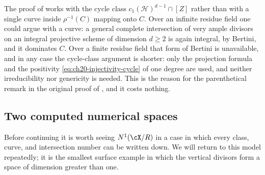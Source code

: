 \begin{remark}
\label{rem:ch20-cycle-not-curve}
The proof of  works with the cycle class
$c_1(\mathcal H)^{d-1}\cap[Z]$ rather than with a single curve inside
$\rho^{-1}(C)$ mapping onto $C$.  Over an infinite residue field one
could argue with a curve: a general complete intersection of very ample
divisors on an integral projective scheme of dimension $d\geq2$ is again
integral, by Bertini, and it dominates $C$.  Over a finite residue field
that form of Bertini is unavailable, and in any case the cycle-class
argument is shorter: only the projection formula and the positivity
\eqref{eq:ch20-injectivity-cycle} of one degree are used, and neither
irreducibility nor genericity is needed.  This is the reason for the
parenthetical remark in the original proof of
, and it costs nothing.
\end{remark}

\subsection{Two computed numerical spaces}
\label{sec:ch20-n1-examples}

Before continuing it is worth seeing $N^1(\cX/R)$ in a case in which every
class, curve, and intersection number can be written down.  We will return
to this model repeatedly; it is the smallest surface example in which the
vertical divisors form a space of dimension greater than one.

